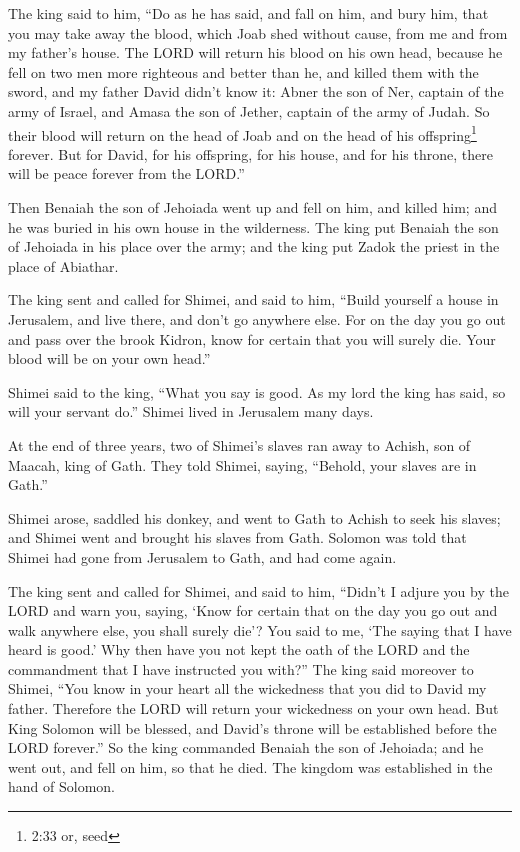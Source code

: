 \myverse{}The king said to him, “Do as he has said, and fall on him, and
bury him, that you may take away the blood, which Joab shed without cause, from me and from my father’s
house.
\myverse{}The LORD will return his blood on his own head, because he fell on two men
more righteous and better than he, and killed them with the sword, and my father David didn’t know it:
Abner the son of Ner, captain of the army of Israel, and Amasa the son of Jether, captain of the army
of Judah.
\myverse{}So their blood will return on the head of Joab and on the head of his offspring\footnote{2:33 or, seed} forever. But for David, for his offspring, for his house, and for his throne,
there will be peace forever from the LORD.”

\myverse{}Then Benaiah the son of Jehoiada went up and fell on him, and
killed him; and he was buried in his own house in the wilderness.
\myverse{}The king put Benaiah the son of Jehoiada in his place over the army; and the
king put Zadok the priest in the place of Abiathar.

\myverse{}The king sent and called for Shimei, and said to him, “Build
yourself a house in Jerusalem, and live there, and don’t go anywhere else.
\myverse{}For on the day you go out and pass over the brook Kidron, know for certain
that you will surely die. Your blood will be on your own head.”

\myverse{}Shimei said to the king, “What you say is good. As my lord the
king has said, so will your servant do.” Shimei lived in Jerusalem many days.

\myverse{}At the end of three years, two of Shimei’s slaves ran away to
Achish, son of Maacah, king of Gath. They told Shimei, saying, “Behold, your slaves are in Gath.”

\myverse{}Shimei arose, saddled his donkey, and went to Gath to Achish
to seek his slaves; and Shimei went and brought his slaves from Gath.
\myverse{}Solomon was told that Shimei had gone from Jerusalem to Gath, and had come
again.

\myverse{}The king sent and called for Shimei, and said to him, “Didn’t
I adjure you by the LORD and warn you, saying, ‘Know for certain that on the day you go out and walk anywhere
else, you shall surely die’? You said to me, ‘The saying that I have heard is good.’
\myverse{}Why then have you not kept the oath of the LORD and the commandment that I
have instructed you with?”
\myverse{}The king said moreover to Shimei, “You know in your heart all the wickedness
that you did to David my father. Therefore the LORD will return your wickedness on your own head.
\myverse{}But King Solomon will be blessed, and David’s throne will be established before
the LORD forever.”
\myverse{}So the king commanded Benaiah the son of Jehoiada; and he went out, and fell
on him, so that he died. The kingdom was established in the hand of Solomon.


